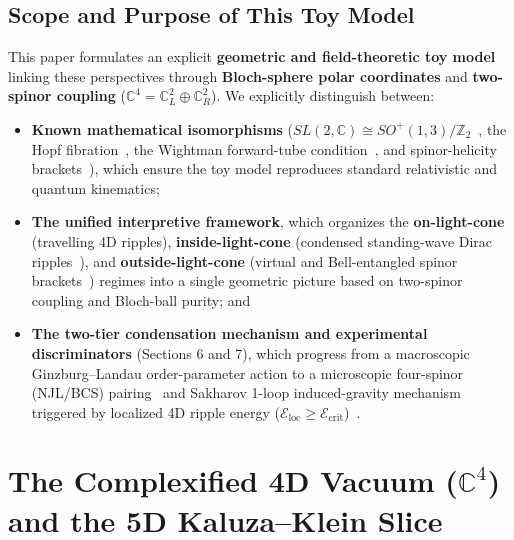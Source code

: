 \documentclass[11pt,a4paper]{article}
\begin{document}
\subsection*{Scope and Purpose of This Toy Model}
This paper formulates an explicit \textbf{geometric and field-theoretic toy model} linking these perspectives through \textbf{Bloch-sphere polar coordinates} and \textbf{two-spinor coupling} ($\mathbb{C}^4 = \mathbb{C}^2_L \oplus \mathbb{C}^2_R$). We explicitly distinguish between:
\begin{itemize}
    \item \textbf{Known mathematical isomorphisms} ($SL(2,\mathbb{C}) \cong SO^+(1,3)/\mathbb{Z}_2$~\cite{PenroseRindler1984}, the Hopf fibration~\cite{Hopf1931}, the Wightman forward-tube condition~\cite{StreaterWightman1964}, and spinor-helicity brackets~\cite{ParkeTaylor1986}), which ensure the toy model reproduces standard relativistic and quantum kinematics;
    \item \textbf{The unified interpretive framework}, which organizes the \textbf{on-light-cone} (travelling 4D ripples), \textbf{inside-light-cone} (condensed standing-wave Dirac ripples~\cite{Dirac1928,PenroseRoad2004}), and \textbf{outside-light-cone} (virtual and Bell-entangled spinor brackets~\cite{Feynman1949,Bell1964}) regimes into a single geometric picture based on two-spinor coupling and Bloch-ball purity; and
    \item \textbf{The two-tier condensation mechanism and experimental discriminators} (Sections 6 and 7), which progress from a macroscopic Ginzburg--Landau order-parameter action to a microscopic four-spinor (NJL/BCS) pairing~\cite{NJL1961,ColemanWeinberg1973} and Sakharov 1-loop induced-gravity mechanism~\cite{Sakharov1967} triggered by localized 4D ripple energy ($\mathcal{E}_{\text{loc}} \ge \mathcal{E}_{\text{crit}}$)~\cite{Wheeler1955}.
\end{itemize}

\section{The Complexified 4D Vacuum (\texorpdfstring{$\mathbb{C}^4$}{C4}) and the 5D Kaluza--Klein Slice}
\end{document}
